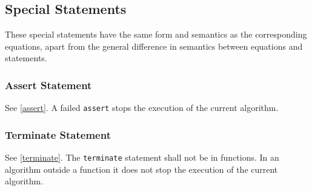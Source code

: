 \subsection{Special Statements}\label{special-statements}

These special statements have the same form and semantics as the
corresponding equations, apart from the general difference in semantics
between equations and statements.

\subsubsection{Assert Statement}\label{assert-statement}

See \cref{assert}.  A failed \lstinline!assert! stops the execution of the current algorithm.

\subsubsection{Terminate Statement}\label{terminate-statement}

See \cref{terminate}.  The \lstinline!terminate! statement shall not be in functions.  In an algorithm outside a function it does not stop the execution of the current algorithm.

